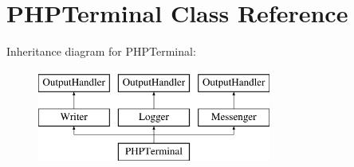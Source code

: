 \hypertarget{classPHPTerminal}{\section{P\-H\-P\-Terminal Class Reference}
\label{classPHPTerminal}
}
Inheritance diagram for P\-H\-P\-Terminal\-:\begin{figure}[H]
\begin{center}
\leavevmode
\includegraphics[height=3.000000cm]{classPHPTerminal}
\end{center}
\end{figure}
